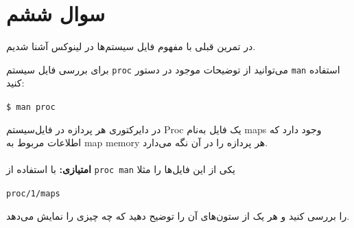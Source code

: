 \section{سوال ششم}

در تمرین قبلی با مفهوم فایل سیستم‌ها در لینوکس آشنا شدیم.

برای بررسی فایل سیستم \texttt{proc} می‌توانید از توضیحات موجود در دستور \texttt{man} استفاده کنید:

\begin{latin}
	\texttt{\$ man proc}
\end{latin}

در دایرکتوری هر پردازه در فایل‌سیستم Proc یک فایل به‌نام maps وجود دارد که اطلاعات مربوط به map memory هر پردازه را در آن نگه می‌دارد. \\ \\


\textbf{امتیازی: }با استفاده از \texttt{proc man} یکی از این فایل‌ها را مثلا
\begin{latin}
	\texttt{proc/1/maps}
\end{latin}
را بررسی کنید و هر یک از ستون‌های آن را توضیح دهید که چه چیزی را نمایش می‌دهد.


